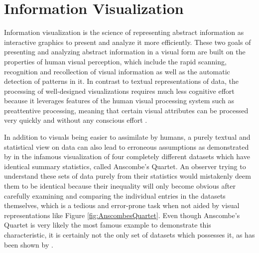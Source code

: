 \chapter{Information Visualization}
\label{chap:InfoVis}

Information visualization is the science of representing abstract information as interactive graphics to present and analyze it more efficiently.
These two goals of presenting and analyzing abstract information in a visual form are built on the properties of human visual perception, which include the rapid scanning, recognition and recollection of visual information as well as the automatic detection of patterns in it.
In contrast to textual representations of data, the processing of well-designed visualizations requires much less cognitive effort because it leverages features of the human visual processing system such as preattentive processing, meaning that certain visual attributes can be processed very quickly and without any conscious effort \parencite{PreattentiveProcessing}.

In addition to visuals being easier to assimilate by humans, a purely textual and statistical view on data can also lead to erroneous assumptions as demonstrated by \cite{AnscombesQuartet} in the infamous visualization of four completely different datasets which have identical summary statistics, called Anscombe's Quartet.
An observer trying to understand these sets of data purely from their statistics would mistakenly deem them to be identical because their inequality will only become obvious after carefully examining and comparing the individual entries in the datasets themselves, which is a tedious and error-prone task when not aided by visual representations like Figure \ref{fig:AnscombesQuartet}.
Even though Anscombe's Quartet is very likely the most famous example to demonstrate this characteristic, it is certainly not the only set of datasets which possesses it, as has been shown by \cite{GenDataIdenticalStatisticsDissimilarGraphics}.

